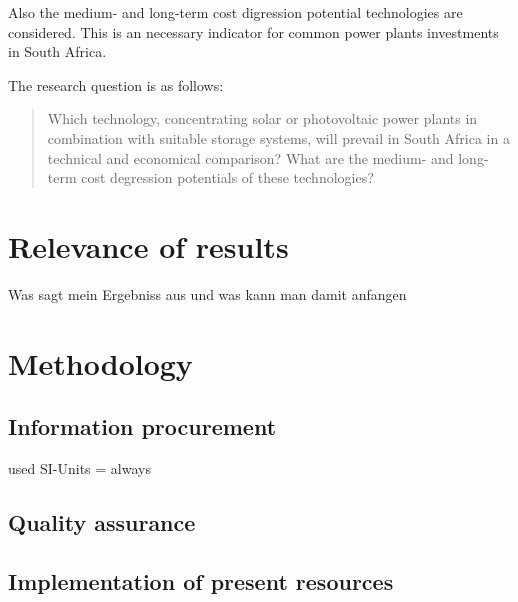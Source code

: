 Also the medium- and long-term cost digression potential technologies are considered. This is an necessary indicator for common power plants investments in South Africa.



The research question is as follows:
\begin{quote}
Which technology, concentrating solar or photovoltaic power plants in combination with suitable storage systems, will prevail in South Africa in a technical and economical comparison? What are the medium- and long-term cost degression potentials of these technologies?
\end{quote}


\section{Relevance of results}
Was sagt mein Ergebniss aus und was kann man damit anfangen
\section{Methodology}

\subsection{Information procurement}
used SI-Units  = always 
\subsection{Quality assurance}

\subsection{Implementation of present resources}

\pagebreak

